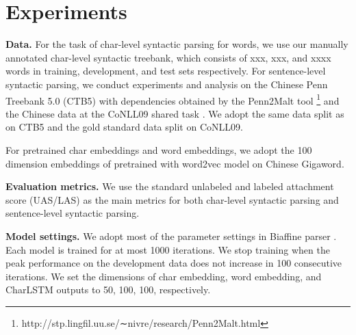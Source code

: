 




\section{Experiments}
\textbf{Data.}
For the task of char-level syntactic parsing for words, we use our manually annotated char-level syntactic treebank, which consists of xxx, xxx, and xxxx words in training, development, and test sets respectively. For sentence-level syntactic parsing, we conduct experiments and analysis on the Chinese Penn Treebank 5.0 (CTB5) with dependencies obtained by the Penn2Malt tool \footnote{http://stp.lingfil.uu.se/∼nivre/research/Penn2Malt.html} and the Chinese data at the
CoNLL09 shared task \citet{conll09}. We adopt the same data split as \citet{zhang-clark-2008} on CTB5 and the gold standard data split on CoNLL09. 

For pretrained char embeddings and word embeddings, we adopt the 100 dimension embeddings of \citet{liying-2019} pretrained with word2vec model on Chinese Gigaword.

\textbf{Evaluation metrics.} 
We use the standard unlabeled and labeled attachment score (UAS/LAS) as the main metrics for both char-level syntactic parsing and sentence-level syntactic parsing.

\textbf{Model settings.} 
We adopt most of the parameter settings in Biaffine parser \cite{dozat2016deep}. Each model is
trained for at most 1000 iterations.
We stop training when the peak performance
on the development data does not increase in 100 consecutive iterations. 
We set the dimensions of char embedding, word
embedding, and CharLSTM outputs to 50, 100, 100, respectively. 

